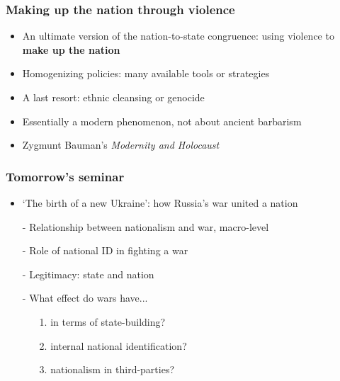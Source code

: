 \documentclass[aspectratio=43]{beamer}
\begin{document}
\begin{frame}
\frametitle{Making up the nation through violence}
\centering

\begin{itemize}
  \item An ultimate version of the nation-to-state congruence: using violence to \textbf{make up the nation}
  \item Homogenizing policies: many available tools or strategies
  \item A last resort: ethnic cleansing or genocide
  \item Essentially a modern phenomenon, not about ancient barbarism
  \item Zygmunt Bauman's \textit{Modernity and Holocaust}
\end{itemize}

\end{frame}


\begin{frame}
\frametitle{Tomorrow's seminar}
\centering

\begin{itemize}
  \item `The birth of a new Ukraine': how Russia's war united a nation
  \item[]
  \item[-] Relationship between nationalism and war, macro-level
  \item[-] Role of national ID in fighting a war
  \item[-] Legitimacy: state and nation
  \item[-] What effect do wars have...
  \begin{itemize}
    \item[1.] in terms of state-building?
    \item[2.] internal national identification?
    \item[3.] nationalism in third-parties?
  \end{itemize}
\end{itemize}

\end{frame}
\end{document}
